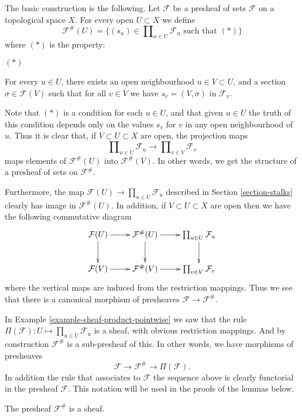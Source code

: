 \medskip\noindent
The basic construction is the following. Let $\mathcal{F}$ be a presheaf
of sets $\mathcal{F}$ on a topological space $X$.
For every open $U \subset X$ we define
$$
\mathcal{F}^{\#}(U)
=
\{
(s_u) \in \prod\nolimits_{u \in U} \mathcal{F}_u
\text{ such that }(*)
\}
$$
where $(*)$ is the property:
\begin{list}{$(*)$}{}
\item For every $u \in U$, there exists an open neighbourhood
$u \in V \subset U$, and a section $\sigma \in \mathcal{F}(V)$
such that for all $v \in V$ we have $s_v = (V, \sigma)$
in $\mathcal{F}_v$.
\end{list}
Note that $(*)$ is a condition for each $u \in U$,
and that given $u \in U$ the truth of this condition
depends only on the values $s_v$ for $v$ in any open neighbourhood
of $u$. Thus it is clear that,
if $V \subset U \subset X$ are open, the projection maps
$$
\prod\nolimits_{u \in U} \mathcal{F}_u
\longrightarrow
\prod\nolimits_{v \in V} \mathcal{F}_v
$$
maps elements of $\mathcal{F}^{\#}(U)$ into $\mathcal{F}^{\#}(V)$.
In other words, we get the structure of a presheaf of sets
on $\mathcal{F}^{\#}$.

\medskip\noindent
Furthermore, the map $\mathcal{F}(U) \to \prod_{u \in U} \mathcal{F}_u$
described in Section \ref{section-stalks} clearly has image
in $\mathcal{F}^{\#}(U)$. In addition, if $V \subset U \subset X$ are
open then we have the following commutative diagram
$$
\xymatrix{
\mathcal{F}(U) \ar[r] \ar[d] &
\mathcal{F}^{\#}(U) \ar[r] \ar[d] &
\prod_{u\in U} \mathcal{F}_u \ar[d]\cr
\mathcal{F}(V) \ar[r] &
\mathcal{F}^{\#}(V) \ar[r] &
\prod_{v\in V} \mathcal{F}_v
}
$$
where the vertical maps are induced from the
restriction mappings. Thus we see that
there is a canonical morphism of presheaves
$\mathcal{F} \to \mathcal{F}^{\#}$.

\medskip\noindent
In Example \ref{example-sheaf-product-pointwise} we saw
that the rule $\Pi(\mathcal{F}) : U \mapsto \prod_{u\in U} \mathcal{F}_u$
is a sheaf, with obvious restriction mappings. And by construction
$\mathcal{F}^{\#}$ is a sub-presheaf of this. In other words, we
have morphisms of presheaves
$$
\mathcal{F} \to \mathcal{F}^\# \to \Pi(\mathcal{F}).
$$
In addition the rule that associates to $\mathcal{F}$
the sequence above is clearly functorial in the presheaf $\mathcal{F}$.
This notation will be
used in the proofs of the lemmas below.

\begin{lemma}
\label{lemma-sheafification-sheaf}
The presheaf $\mathcal{F}^{\#}$ is a sheaf.
\end{lemma}

